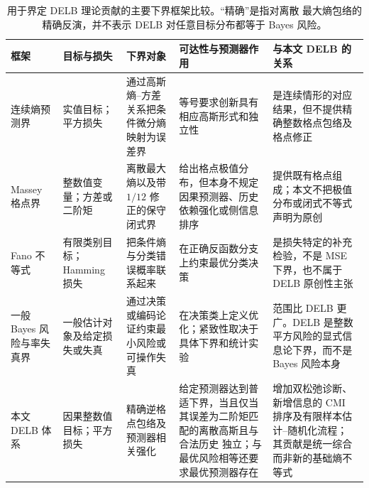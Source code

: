 \begin{table}[H]
\caption{用于界定 DELB 理论贡献的主要下界框架比较。“精确”是指对离散
最大熵包络的精确反演，并不表示 DELB 对任意目标分布都等于 Bayes 风险。}
\label{tab:core_bound_comparison}
\centering
\scriptsize
\setlength{\tabcolsep}{3pt}
\begin{tabularx}{\textwidth}{
    >{\RaggedRight\arraybackslash}p{}
    >{\RaggedRight\arraybackslash}p{}
    >{\RaggedRight\arraybackslash}p{}
    >{\RaggedRight\arraybackslash}p{}
    >{\RaggedRight\arraybackslash}X}
\toprule
\textbf{框架} & \textbf{目标与损失} & \textbf{下界对象} &
\textbf{可达性与预测器作用} & \textbf{与本文 DELB 的关系}\\
\midrule
连续熵预测界 \citep{fang_variance_bounds}
& 实值目标；平方损失
& 通过高斯熵--方差关系把条件微分熵映射为误差界
& 等号要求创新具有相应高斯形式和独立性
& 是连续情形的对应结果，但不提供精确整数格点包络及格点修正\\

Massey 格点界 \citep{massey_integer_entropy,rioul_massey}
& 整数值变量；方差或二阶矩
& 离散最大熵以及带 \(1/12\) 修正的保守闭式界
& 给出格点极值分布，但本身不规定因果预测器、历史依赖强化或侧信息排序
& 提供既有格点组成；本文不把极值分布或闭式不等式声明为原创\\

Fano 不等式 \citep{cover_thomas,feder_merhav}
& 有限类别目标；Hamming 损失
& 把条件熵与分类错误概率联系起来
& 在正确反函数分支上约束最优分类决策
& 是损失特定的补充检验，不是 MSE 下界，也不属于 DELB 原创性主张\\

一般 Bayes 风险与率失真界
\citep{shannon_rate_distortion,chen_bayes_risk}
& 一般估计对象及给定损失或失真
& 通过决策或编码论证约束最小风险或可操作失真
& 在决策类上定义优化；紧致性取决于具体下界和统计实验
& 范围比 DELB 更广。DELB 是整数平方风险的显式信息论下界，而不是 Bayes
风险本身\\

本文 DELB 体系
& 因果整数值目标；平方损失
& 精确逆格点包络及预测器相关强化
& 给定预测器达到普适下界，当且仅当其误差为二阶矩匹配的离散高斯且与合法历史
独立；与最优风险相等还要求最优预测器存在
& 增加双松弛诊断、新增信息的 CMI 排序及有限样本估计--随机化流程；
其贡献是统一综合而非新的基础熵不等式\\
\bottomrule
\end{tabularx}
\end{table}
